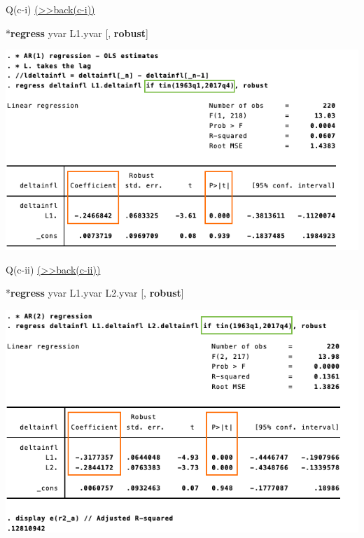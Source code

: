 \documentclass[
  10pt,
  ignorenonframetext,
]{beamer}
\newenvironment{Shaded}{\begin{snugshade}}{\end{snugshade}}
\newcommand{\KeywordTok}[1]{\textcolor[rgb]{0.13,0.29,0.53}{\textbf{#1}}}
\newcommand{\NormalTok}[1]{#1}
\begin{document}
\begin{frame}[fragile]{Q(c-i)
\footnotesize \protect\hyperlink{AR1-A}{(\textgreater\textgreater back(c-i))}
\normalsize }
\protect\hypertarget{AR1}{}
\small

\begin{Shaded}
\begin{Highlighting}[]
\NormalTok{*}\KeywordTok{regress}\NormalTok{ yvar L1.yvar [, }\KeywordTok{robust}\NormalTok{]}
\end{Highlighting}
\end{Shaded}

\begin{flushleft}\includegraphics[width=0.9\linewidth]{pictures/(c-i)AR1} \end{flushleft}
\end{frame}

\begin{frame}[fragile]{Q(c-ii)
\footnotesize \protect\hyperlink{AR12-A}{(\textgreater\textgreater back(c-ii))}
\normalsize }
\protect\hypertarget{AR2}{}
\small

\begin{Shaded}
\begin{Highlighting}[]
\NormalTok{*}\KeywordTok{regress}\NormalTok{ yvar L1.yvar L2.yvar [, }\KeywordTok{robust}\NormalTok{]}
\end{Highlighting}
\end{Shaded}

\begin{flushleft}\includegraphics[width=0.9\linewidth]{pictures/(c-ii)AR2} \end{flushleft}
\end{frame}
\end{document}
